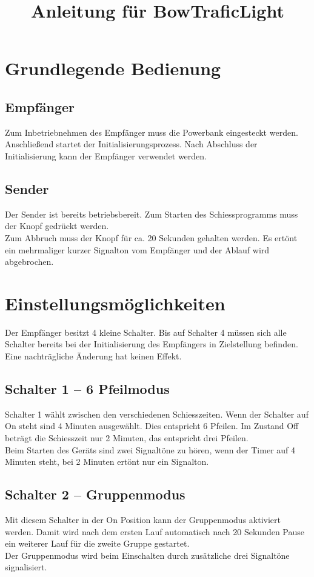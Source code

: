 \documentclass[12pt,a4paper,final]{article}
\title{Anleitung für BowTraficLight}
\date{\vspace{-10ex}}
\begin{document}
\maketitle
\section{Grundlegende Bedienung}
\subsection{Empfänger}
Zum Inbetriebnehmen des Empfänger muss die Powerbank eingesteckt werden. Anschließend startet der Initialisierungsprozess. Nach Abschluss der Initialisierung kann der Empfänger verwendet werden.
\subsection{Sender}
Der Sender ist bereits betriebsbereit. Zum Starten des Schiessprogramms muss der Knopf gedrückt werden.\\
Zum Abbruch muss der Knopf für ca. 20 Sekunden gehalten werden. Es ertönt ein mehrmaliger kurzer Signalton vom Empfänger und der Ablauf wird abgebrochen.
\section{Einstellungsmöglichkeiten}
Der Empfänger besitzt 4 kleine Schalter. Bis auf Schalter 4 müssen sich alle Schalter bereits bei der Initialisierung des Empfängers in Zielstellung befinden. Eine nachträgliche Änderung hat keinen Effekt.
\subsection{Schalter 1 -- 6 Pfeilmodus}
Schalter 1 wählt zwischen den verschiedenen Schiesszeiten. Wenn der Schalter auf On steht sind 4 Minuten ausgewählt. Dies entspricht 6 Pfeilen. Im Zustand Off beträgt die Schiesszeit nur 2 Minuten, das entspricht drei Pfeilen.\\
Beim Starten des Geräts sind zwei Signaltöne zu hören, wenn der Timer auf 4 Minuten steht, bei 2 Minuten ertönt nur ein Signalton.
\subsection{Schalter 2 -- Gruppenmodus}
Mit diesem Schalter in der On Position kann der Gruppenmodus aktiviert werden. Damit wird nach dem ersten Lauf automatisch nach 20 Sekunden Pause ein weiterer Lauf für die zweite Gruppe gestartet.\\
Der Gruppenmodus wird beim Einschalten durch zusätzliche drei Signaltöne signalisiert.
\end{document}
